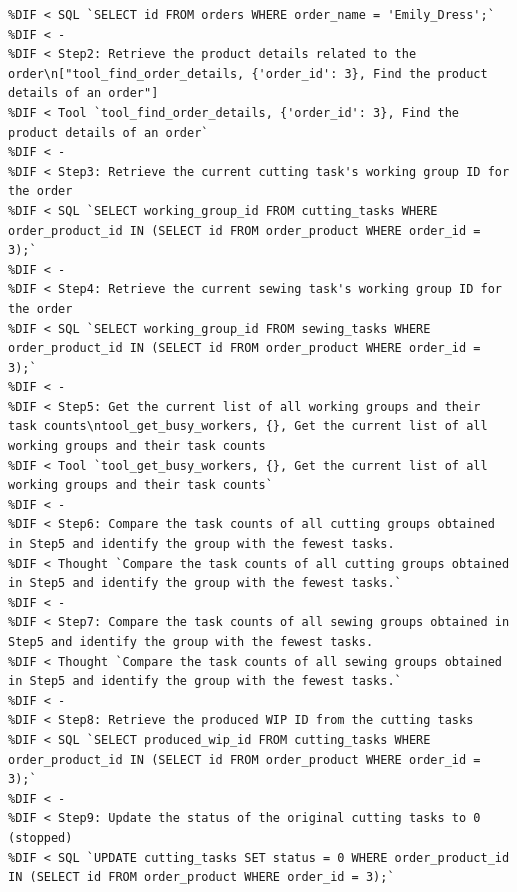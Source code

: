 \documentclass[preprint,12pt]{elsarticle}
\providecommand{\DIFmodbegin}{} %
\providecommand{\DIFmodend}{} %
\begin{document}
\DIFmodbegin
\begin{lstlisting}[style=my_operation, label={lst:chain_of_operation},alsolanguage=DIFcode]
%DIF < Step 1: Retrieve the order ID for the order with the name "Emily_Dress"
%DIF < SQL `SELECT id FROM orders WHERE order_name = 'Emily_Dress';`
%DIF < -
%DIF < Step2: Retrieve the product details related to the order\n["tool_find_order_details, {'order_id': 3}, Find the product details of an order"]
%DIF < Tool `tool_find_order_details, {'order_id': 3}, Find the product details of an order`
%DIF < -
%DIF < Step3: Retrieve the current cutting task's working group ID for the order
%DIF < SQL `SELECT working_group_id FROM cutting_tasks WHERE order_product_id IN (SELECT id FROM order_product WHERE order_id = 3);`
%DIF < -
%DIF < Step4: Retrieve the current sewing task's working group ID for the order
%DIF < SQL `SELECT working_group_id FROM sewing_tasks WHERE order_product_id IN (SELECT id FROM order_product WHERE order_id = 3);`
%DIF < -
%DIF < Step5: Get the current list of all working groups and their task counts\ntool_get_busy_workers, {}, Get the current list of all working groups and their task counts
%DIF < Tool `tool_get_busy_workers, {}, Get the current list of all working groups and their task counts`
%DIF < -
%DIF < Step6: Compare the task counts of all cutting groups obtained in Step5 and identify the group with the fewest tasks.
%DIF < Thought `Compare the task counts of all cutting groups obtained in Step5 and identify the group with the fewest tasks.`
%DIF < -
%DIF < Step7: Compare the task counts of all sewing groups obtained in Step5 and identify the group with the fewest tasks.
%DIF < Thought `Compare the task counts of all sewing groups obtained in Step5 and identify the group with the fewest tasks.`
%DIF < -
%DIF < Step8: Retrieve the produced WIP ID from the cutting tasks
%DIF < SQL `SELECT produced_wip_id FROM cutting_tasks WHERE order_product_id IN (SELECT id FROM order_product WHERE order_id = 3);`
%DIF < -
%DIF < Step9: Update the status of the original cutting tasks to 0 (stopped)
%DIF < SQL `UPDATE cutting_tasks SET status = 0 WHERE order_product_id IN (SELECT id FROM order_product WHERE order_id = 3);`
\end{lstlisting}
\DIFmodend %
\end{document}
